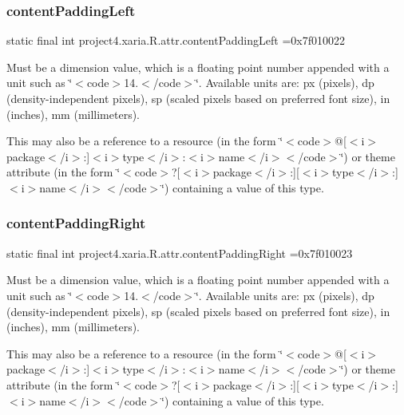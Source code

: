\subsubsection{\texorpdfstring{content\+Padding\+Left}{contentPaddingLeft}}
{\footnotesize\ttfamily static final int project4.\+xaria.\+R.\+attr.\+content\+Padding\+Left =0x7f010022\hspace{0.3cm}{\ttfamily [static]}}

Must be a dimension value, which is a floating point number appended with a unit such as \char`\"{}$<$code$>$14.\+5sp$<$/code$>$\char`\"{}. Available units are\+: px (pixels), dp (density-\/independent pixels), sp (scaled pixels based on preferred font size), in (inches), mm (millimeters). 

This may also be a reference to a resource (in the form \char`\"{}$<$code$>$@\mbox{[}$<$i$>$package$<$/i$>$\+:\mbox{]}$<$i$>$type$<$/i$>$\+:$<$i$>$name$<$/i$>$$<$/code$>$\char`\"{}) or theme attribute (in the form \char`\"{}$<$code$>$?\mbox{[}$<$i$>$package$<$/i$>$\+:\mbox{]}\mbox{[}$<$i$>$type$<$/i$>$\+:\mbox{]}$<$i$>$name$<$/i$>$$<$/code$>$\char`\"{}) containing a value of this type. \mbox{\label{classproject4_1_1xaria_1_1R_1_1attr_ac1ee232f2551be9ac4e7e959cf91fb23}} 
\subsubsection{\texorpdfstring{content\+Padding\+Right}{contentPaddingRight}}
{\footnotesize\ttfamily static final int project4.\+xaria.\+R.\+attr.\+content\+Padding\+Right =0x7f010023\hspace{0.3cm}{\ttfamily [static]}}

Must be a dimension value, which is a floating point number appended with a unit such as \char`\"{}$<$code$>$14.\+5sp$<$/code$>$\char`\"{}. Available units are\+: px (pixels), dp (density-\/independent pixels), sp (scaled pixels based on preferred font size), in (inches), mm (millimeters). 

This may also be a reference to a resource (in the form \char`\"{}$<$code$>$@\mbox{[}$<$i$>$package$<$/i$>$\+:\mbox{]}$<$i$>$type$<$/i$>$\+:$<$i$>$name$<$/i$>$$<$/code$>$\char`\"{}) or theme attribute (in the form \char`\"{}$<$code$>$?\mbox{[}$<$i$>$package$<$/i$>$\+:\mbox{]}\mbox{[}$<$i$>$type$<$/i$>$\+:\mbox{]}$<$i$>$name$<$/i$>$$<$/code$>$\char`\"{}) containing a value of this type. \mbox{\label{classproject4_1_1xaria_1_1R_1_1attr_a4363552a9aa7bfc8f3fa883bb0de1fa1}} 
